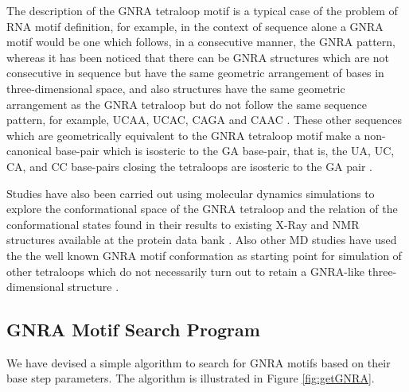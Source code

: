 The description of  the GNRA tetraloop motif is a  typical case of the
problem  of RNA  motif  definition,  for example,  in  the context  of
sequence  alone  a  GNRA  motif  would  be one  which  follows,  in  a
consecutive manner, the GNRA pattern, whereas it has been noticed that
there can be GNRA structures which are not consecutive in sequence but
have  the same  geometric  arrangement of  bases in  three-dimensional
space, and also structures have  the same geometric arrangement as the
GNRA  tetraloop but  do  not  follow the  same  sequence pattern,  for
example, UCAA,  UCAC, CAGA  and CAAC \cite{lemieux2006}.   These other
sequences  which are  geometrically equivalent  to the  GNRA tetraloop
motif  make a  non-canonical base-pair  which is  isosteric to  the GA
base-pair,  that is, the  UA, UC,  CA, and  CC base-pairs  closing the
tetraloops are isosteric to the GA pair \cite{lemieux2006}.

Studies  have   also  been   carried  out  using   molecular  dynamics
simulations to explore the  conformational space of the GNRA tetraloop
and the relation  of the conformational states found  in their results
to existing  X-Ray and  NMR structures available  at the  protein data
bank \cite{sorin2002, depaul2010}. Also other MD studies have used the
the  well  known GNRA  motif conformation  as starting  point for
simulation of  other tetraloops which  do not necessarily turn  out to
retain a GNRA-like three-dimensional structure \cite{srinivasan1998}.

\subsection{GNRA Motif Search Program}
We have  devised a simple algorithm to search for GNRA  motifs based on
their base  step parameters.  The  algorithm is illustrated  in Figure
\ref{fig:getGNRA}.

